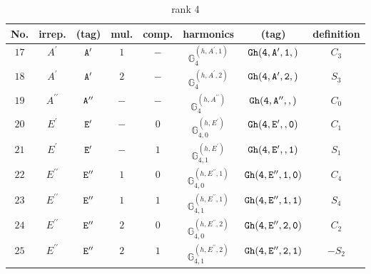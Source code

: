 \documentclass[fleqn,8pt]{jsarticle}
\begin{document}
\begin{table}[ht!]
\begin{center}
\caption{rank 4}
\renewcommand{\arraystretch}{1.3}
\begin{tabular}{cccccccc} \hline \hline
No. & irrep. & (tag) & mul. & comp. & harmonics & (tag) & definition \\ \hline
$ 17 $ & $ A^{\prime} $ & $ {\tt A'} $ & $ 1 $ & $ - $ & $ \mathbb{G}_{4}^{(h,A^{\prime},1)} $ & $ {\tt Gh(4,A',1,)} $ & $ C_{3} $ \\
$ 18 $ & $ A^{\prime} $ & $ {\tt A'} $ & $ 2 $ & $ - $ & $ \mathbb{G}_{4}^{(h,A^{\prime},2)} $ & $ {\tt Gh(4,A',2,)} $ & $ S_{3} $ \\
$ 19 $ & $ A^{\prime\prime} $ & $ {\tt A''} $ & $ - $ & $ - $ & $ \mathbb{G}_{4}^{(h,A^{\prime\prime})} $ & $ {\tt Gh(4,A'',,)} $ & $ C_{0} $ \\
$ 20 $ & $ E^{\prime} $ & $ {\tt E'} $ & $ - $ & $ 0 $ & $ \mathbb{G}_{4,0}^{(h,E^{\prime})} $ & $ {\tt Gh(4,E',,0)} $ & $ C_{1} $ \\
$ 21 $ & $ E^{\prime} $ & $ {\tt E'} $ & $ - $ & $ 1 $ & $ \mathbb{G}_{4,1}^{(h,E^{\prime})} $ & $ {\tt Gh(4,E',,1)} $ & $ S_{1} $ \\
$ 22 $ & $ E^{\prime\prime} $ & $ {\tt E''} $ & $ 1 $ & $ 0 $ & $ \mathbb{G}_{4,0}^{(h,E^{\prime\prime},1)} $ & $ {\tt Gh(4,E'',1,0)} $ & $ C_{4} $ \\
$ 23 $ & $ E^{\prime\prime} $ & $ {\tt E''} $ & $ 1 $ & $ 1 $ & $ \mathbb{G}_{4,1}^{(h,E^{\prime\prime},1)} $ & $ {\tt Gh(4,E'',1,1)} $ & $ S_{4} $ \\
$ 24 $ & $ E^{\prime\prime} $ & $ {\tt E''} $ & $ 2 $ & $ 0 $ & $ \mathbb{G}_{4,0}^{(h,E^{\prime\prime},2)} $ & $ {\tt Gh(4,E'',2,0)} $ & $ C_{2} $ \\
$ 25 $ & $ E^{\prime\prime} $ & $ {\tt E''} $ & $ 2 $ & $ 1 $ & $ \mathbb{G}_{4,1}^{(h,E^{\prime\prime},2)} $ & $ {\tt Gh(4,E'',2,1)} $ & $ - S_{2} $ \\
 \hline \hline
\end{tabular}
\end{center}
\end{table}
\end{document}
